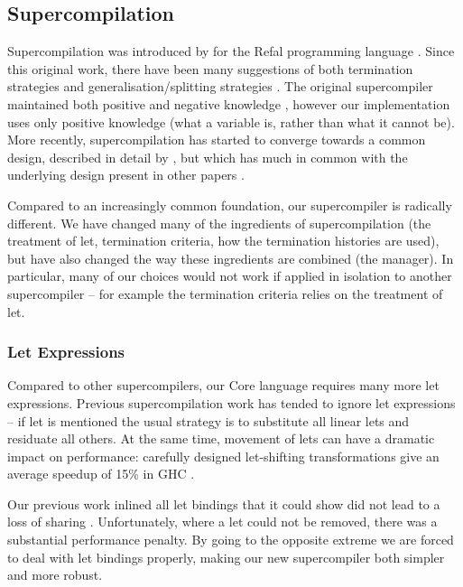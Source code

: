 \documentclass[draft]{sigplanconf}
\begin{document}
\subsection{Supercompilation}
\label{sec:comparison}

Supercompilation was introduced by \citet{supercompilation} for the Refal programming language \cite{refal}. Since this original work, there have been many suggestions of both termination strategies and generalisation/splitting strategies \cite{turchin:generalisation,sorensen:supercompilation,leuschel:homeomorphic}. The original supercompiler maintained both positive and negative knowledge \cite{secher:perfect_supercompilation}, however our implementation uses only positive knowledge (what a variable is, rather than what it cannot be). More recently, supercompilation has started to converge towards a common design, described in detail by \citet{klyuchnikov:hosc}, but which has much in common with the underlying design present in other papers \cite{me:supero,jonsson:supercompilation}.

Compared to an increasingly common foundation, our supercompiler is radically different. We have changed many of the ingredients of supercompilation (the treatment of let, termination criteria, how the termination histories are used), but have also changed the way these ingredients are combined (the manager). In particular, many of our choices would not work if applied in isolation to another supercompiler -- for example the termination criteria relies on the treatment of let.

\subsubsection{Let Expressions}

Compared to other supercompilers, our Core language requires many more let expressions. Previous supercompilation work has tended to ignore let expressions -- if let is mentioned the usual strategy is to substitute all linear lets and residuate all others. At the same time, movement of lets can have a dramatic impact on performance: carefully designed let-shifting transformations give an average speedup of 15\% in GHC \cite{spj:letfloating}.

Our previous work inlined all let bindings that it could show did not lead to a loss of sharing \cite{me:supero}. Unfortunately, where a let could not be removed, there was a substantial performance penalty. By going to the opposite extreme we are forced to deal with let bindings properly, making our new supercompiler both simpler and more robust.
\end{document}
